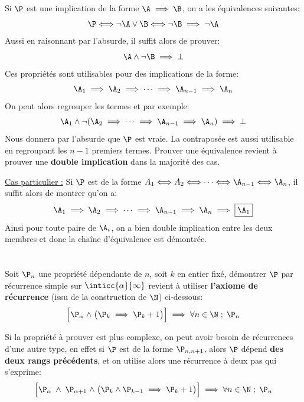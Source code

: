 \section*{}
Si \(\P\) est une implication de la forme \(\A \implies \B\), on a les équivalences suivantes:
\[
   \P \Longleftrightarrow \lnot \A \lor \B \Longleftrightarrow \lnot \B \implies \lnot \A
\]
Aussi en raisonnant par l'absurde, il suffit alors de prouver:
\[
   \A \land \lnot \B \implies \bot 
\]
Ces propriétés sont utilisables pour des implications de la forme:
\[
   \A_1 \implies \A_2 \implies \cdots \implies \A_{n-1} \implies \A_n
\]
On peut alors regrouper les termes et par exemple:
\[
   \A_1 \land \lnot(\A_2 \implies \cdots \implies \A_{n-1} \implies \A_n) \implies \bot
\]
Nous donnera par l'absurde que \(\P\) est vraie. La contraposée est aussi utilisable en regroupant les \(n-1\) premiers termes.
Prouver une équivalence revient à prouver une \textbf{double implication} dans la majorité des cas.\<

\underline{Cas particulier {:}}
Si \(\P\) est de la forme \( A_1 \Longleftrightarrow A_2 \Longleftrightarrow \cdots \Longleftrightarrow \A_{n-1} \Longleftrightarrow \A_n \), il suffit alors de montrer qu'on a:
\[
   \A_1 \implies \A_2 \implies \cdots \implies \A_{n-1} \implies \A_n \implies \boxed{\A_1}
\]
Ainsi pour toute paire de \(\A_i\), on a bien double implication entre les deux membres et donc la chaîne d'équivalence est démontrée.
\section*{}
Soit \(\P_n\) une propriété dépendante de \(n\), soit \(k\) en entier fixé, démontrer \(\P\) par récurrence simple sur 
\(\inticc{\alpha}{\infty}\) revient à utiliser \textbf{l'axiome de récurrence} (issu de la construction de \(\N\)) ci-dessous:
\[
   \Bigr[ \P_{\alpha} \; \land \; \bigr( \P_k \implies \P_k+1 \bigr) \Bigr] \implies \forall n \in \N \; ; \; \P_n   
\]

Si la propriété à prouver est plus complexe, on peut avoir besoin de récurrences d'une autre type, en effet si \(\P\) est de la forme \(\P_{n, n + 1}\), alors \(\P\) dépend \textbf{des deux rangs précédents}, et on utilise alors une récurrence à deux pas qui s'exprime:
\[
   \Bigr[ \P_{\alpha} \; \land \; \P_{\alpha + 1} \; \land \; \bigr( \P_k  \land \P_{k-1}\implies \P_k+1 \bigr) \Bigr] \implies \forall n \in \N \; ; \; \P_n   
\]

